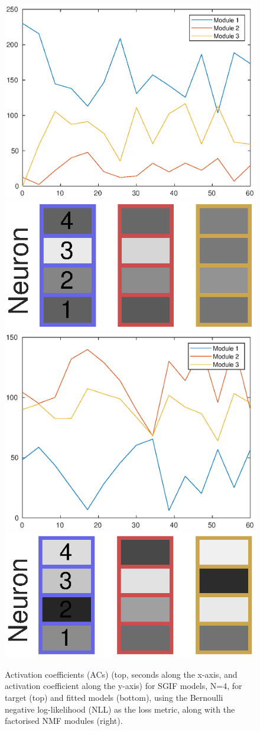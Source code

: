 \documentclass[mphil,deptreport,ianc]{infthesis} %
\begin{document}
\begin{figure}
    \includegraphics[width=0.65\columnwidth]{figures/matlab/NMF/ACs_target_GT_model_mesoGIF_N_4.eps}
    \includegraphics[width=0.3\columnwidth]{figures/matlab/NMF/target_GT_model_mesoGIF_N_4.eps}
    \centering
    \includegraphics[width=0.65\columnwidth]{figures/matlab/NMF/ACs_nuovo_spikes_mt_microGIF_euid_12-09_16-02-03-400_lfn_bernoulli_nll.eps}
    \includegraphics[width=0.3\columnwidth]{figures/matlab/NMF/modules_nuovo_spikes_mt_microGIF_euid_12-09_16-02-03-400_lfn_bernoulli_nll_4.eps}
    \caption{Activation coefficients (ACs) (top, seconds along the x-axis, and activation coefficient along the y-axis) for SGIF models, N=4, for target (top) and fitted models (bottom), using the Bernoulli negative log-likelihood (NLL) as the loss metric, along with the factorised NMF modules (right).}
    \label{fig:ACs_NMF_modules_mesoGIF_4}
\end{figure}
\end{document}
